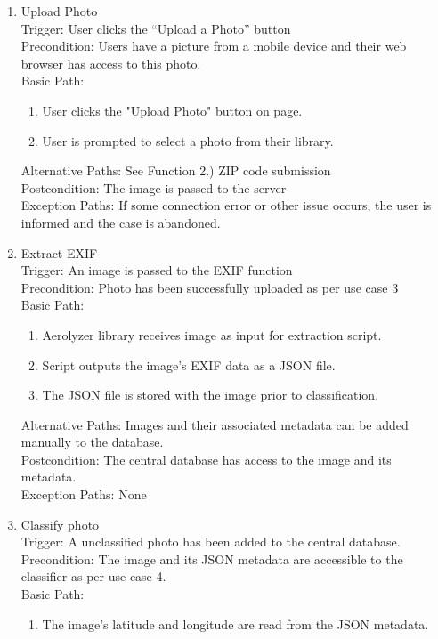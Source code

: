 \documentclass[journal,10pt,draftclsnofoot,onecolumn]{IEEEtran}
\begin{document}
\begin{singlespace}
\begin{enumerate}
	\item Upload Photo\\
		Trigger: User clicks the “Upload a Photo” button\\
		Precondition: Users have a picture from a mobile device and their web browser has access to this photo.\\
		Basic Path:
		\begin{enumerate}
			\item User clicks the "Upload Photo" button on page.
			\item User is prompted to select a photo from their library.
		\end{enumerate}
		Alternative Paths: See Function 2.) ZIP code submission\\
		Postcondition: The image is passed to the server\\
		Exception Paths: If some connection error or other issue occurs, the user is informed and the case is abandoned.
	\\
	\item Extract EXIF\\
		Trigger: An image is passed to the EXIF function\\
		Precondition: Photo has been successfully uploaded as per use case 3\\
		Basic Path:
		\begin{enumerate} 
			\item Aerolyzer library receives image as input for extraction script.
			\item Script outputs the image's EXIF data as a JSON file.
			\item The JSON file is stored with the image prior to classification.
		\end{enumerate}
		Alternative Paths: Images and their associated metadata can be added manually to the database.\\
		Postcondition: The central database has access to the image and its metadata.\\
		Exception Paths: None
	\\
	\item Classify photo\\
		Trigger: A unclassified photo has been added to the central database.\\
		Precondition: The image and its JSON metadata are accessible to the classifier as per use case 4.\\
		Basic Path:
		\begin{enumerate}
			\item The image's latitude and longitude are read from the JSON metadata.

\end{enumerate}
\end{enumerate}
\end{singlespace}
\end{document}
